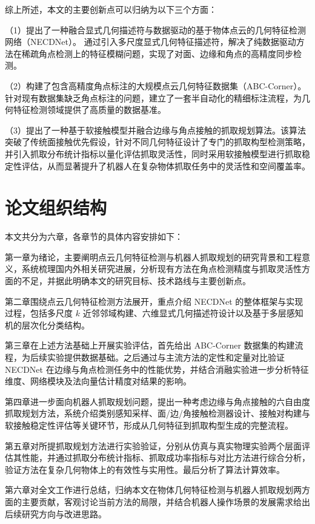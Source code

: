 综上所述，本文的主要创新点可以归纳为以下三个方面：

（1）提出了一种融合显式几何描述符与数据驱动的基于物体点云的几何特征检测网络（NECDNet）。 通过引入多尺度显式几何特征描述符，解决了纯数据驱动方法在稀疏角点检测上的特征模糊问题，实现了对面、边缘和角点的高精度同步检测。

（2）构建了包含高精度角点标注的大规模点云几何特征数据集（ABC-Corner）。针对现有数据集缺乏角点标注的问题，建立了一套半自动化的精细标注流程，为几何特征检测领域提供了高质量的数据基准。

（3）提出了一种基于软接触模型并融合边缘与角点接触的抓取规划算法。该算法突破了传统面接触优先假设，针对不同几何特征设计了专门的抓取构型检测策略，并引入抓取分布统计指标以量化评估抓取灵活性，同时采用软接触模型进行抓取稳定性评估，从而显著提升了机器人在复杂物体抓取任务中的灵活性和空间覆盖率。

\section{论文组织结构}
\label{sec:structure}

本文共分为六章，各章节的具体内容安排如下：

第一章为绪论，主要阐明点云几何特征检测与机器人抓取规划的研究背景和工程意义，系统梳理国内外相关研究进展，分析现有方法在角点检测精度与抓取灵活性方面的不足，并据此明确本文的研究目标、技术路线与主要创新点。

第二章围绕点云几何特征检测方法展开，重点介绍 NECDNet 的整体框架与实现过程，包括多尺度 $k$ 近邻邻域构建、六维显式几何描述符设计以及基于多层感知机的层次化分类结构。

第三章在上述方法基础上开展实验评估，首先给出 ABC-Corner 数据集的构建流程，为后续实验提供数据基础。之后通过与主流方法的定性和定量对比验证 NECDNet 在边缘与角点检测任务中的性能优势，并结合消融实验进一步分析特征维度、网络模块及法向量估计精度对结果的影响。

第四章进一步面向机器人抓取规划问题，提出一种考虑边缘与角点接触的六自由度抓取规划方法，系统介绍类别感知采样、面/边/角接触检测器设计、接触对构建与软接触稳定性评估等关键环节，形成从几何特征到抓取构型生成的完整流程。

第五章对所提抓取规划方法进行实验验证，分别从仿真与真实物理实验两个层面评估其性能，并通过抓取分布统计指标、抓取成功率指标与对比方法进行综合分析，验证方法在复杂几何物体上的有效性与实用性。最后分析了算法计算效率。

第六章对全文工作进行总结，归纳本文在物体几何特征检测与机器人抓取规划两方面的主要贡献，客观讨论当前方法的局限，并结合机器人操作场景的发展需求给出后续研究方向与改进思路。













